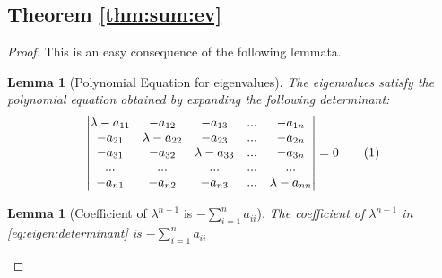 \documentclass[]{article}
\newcommand\numberthis{\addtocounter{equation}{1}\tag{\theequation}}
\newtheorem{lemma}[thm]{Lemma}
\begin{document}
\begin{appendices}
	\subsection{Theorem \ref{thm:sum:ev}}\label{proof:sum_ev}
	\begin{proof}
		This is an easy consequence of the following lemmata. 
		\begin{lemma}[Polynomial Equation for eigenvalues]\label{lemma:ev:determinant}
			The eigenvalues satisfy the polynomial equation obtained by expanding the following determinant:
			\begin{align*}
			\begin{vmatrix}
			\lambda-a_{11}&-a_{12}&-a_{13}&...&-a_{1n}\\
			-a_{21}&\lambda-a_{22}&-a_{23}&...&-a_{2n}\\
			-a_{31}&-a_{32}&\lambda-a_{33}&...&-a_{3n}\\
			...&...&...&...&...\\
			-a_{n1}&-a_{n2}&-a_{n3}&...&\lambda-a_{nn}
			\end{vmatrix}=0\numberthis\label{eq:eigen:determinant}
			\end{align*}
		\end{lemma}
		
		\begin{lemma}[Coefficient of $\lambda^{n-1}$ is $-\sum_{i=1}^{n} a_{ii}$]\label{lemma:coeff:sum}
			The coefficient of $\lambda^{n-1}$  in \eqref{eq:eigen:determinant} is $-\sum_{i=1}^{n} a_{ii}$
		\end{lemma}
		

\end{proof}
\end{appendices}
\end{document}
